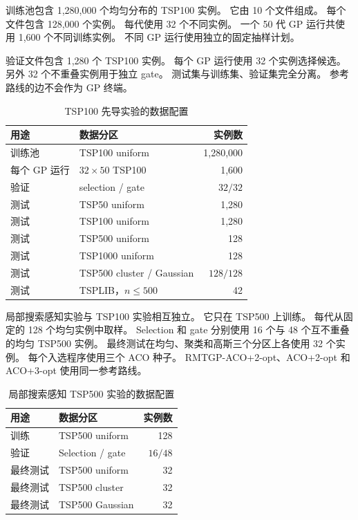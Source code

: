 \documentclass[letterpaper,journal]{IEEEtran}
\begin{document}
训练池包含 1,280,000 个均匀分布的 TSP100 实例。
它由 10 个文件组成。
每个文件包含 128,000 个实例。
每代使用 32 个不同实例。
一个 50 代 GP 运行共使用 1,600 个不同训练实例。
不同 GP 运行使用独立的固定抽样计划。

验证文件包含 1,280 个 TSP100 实例。
每个 GP 运行使用 32 个实例选择候选。
另外 32 个不重叠实例用于独立 gate。
测试集与训练集、验证集完全分离。
参考路线的边不会作为 GP 终端。

\begin{table}[t]
\caption{TSP100 先导实验的数据配置}
\label{tab:data-zh}
\centering
\footnotesize
\begin{tabular}{llr}
\toprule
用途 & 数据分区 & 实例数\\
\midrule
训练池 & TSP100 uniform & 1,280,000\\
每个 GP 运行 & \(32\times50\) TSP100 & 1,600\\
验证 & selection / gate & \(32/32\)\\
测试 & TSP50 uniform & 1,280\\
测试 & TSP100 uniform & 1,280\\
测试 & TSP500 uniform & 128\\
测试 & TSP1000 uniform & 128\\
测试 & TSP500 cluster / Gaussian & \(128/128\)\\
测试 & TSPLIB，\(n\leq500\) & 42\\
\bottomrule
\end{tabular}
\end{table}

局部搜索感知实验与 TSP100 实验相互独立。
它只在 TSP500 上训练。
每代从固定的 128 个均匀实例中取样。
Selection 和 gate 分别使用 16 个与 48 个互不重叠的均匀 TSP500 实例。
最终测试在均匀、聚类和高斯三个分区上各使用 32 个实例。
每个入选程序使用三个 ACO 种子。
RMTGP-ACO+2-opt、ACO+2-opt 和 ACO+3-opt 使用同一参考路线。

\begin{table}[t]
\caption{局部搜索感知 TSP500 实验的数据配置}
\label{tab:ls-data-zh}
\centering
\footnotesize
\begin{tabular}{llr}
\toprule
用途 & 数据分区 & 实例数\\
\midrule
训练 & TSP500 uniform & 128\\
验证 & Selection / gate & \(16/48\)\\
最终测试 & TSP500 uniform & 32\\
最终测试 & TSP500 cluster & 32\\
最终测试 & TSP500 Gaussian & 32\\
\bottomrule
\end{tabular}
\end{table}
\end{document}
